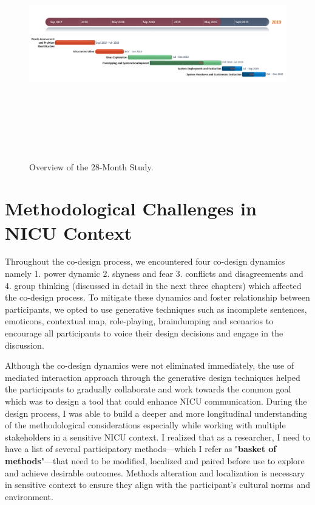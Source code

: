 \begin{figure}[htp]
    \centering
    \includegraphics[width=17cm, height=10cm]{Figures/save.PNG}
    \caption{Overview of the 28-Month Study.}
    \label{fig:timeline}
    \end{figure}

 \section{Methodological Challenges in NICU Context}
 Throughout the co-design process, we encountered four co-design dynamics namely 1. power dynamic 2. shyness and fear 3. conflicts and disagreements and 4. group thinking (discussed in detail in the next three chapters) which affected the co-design process. To mitigate these dynamics and foster relationship between participants, we opted to use generative techniques such as incomplete sentences, emoticons, contextual map, role-playing, braindumping and scenarios to encourage all participants to voice their design decisions and engage in the discussion. 
 
 Although the co-design dynamics were not eliminated immediately, the use of mediated interaction approach through the generative design techniques helped the participants to gradually collaborate and work towards the common goal which was to design a tool that could enhance NICU communication. During the design process, I was able to build a deeper and more longitudinal understanding of the methodological considerations especially while working with multiple stakeholders in a sensitive NICU context. I realized that as a researcher, I need to have a list of several participatory methods---which I refer as "\textbf{basket of methods}"---that need to be modified, localized and paired before use to explore and achieve desirable outcomes. Methods  alteration and localization is necessary in sensitive context to ensure they align with the participant's cultural norms and environment.
 
